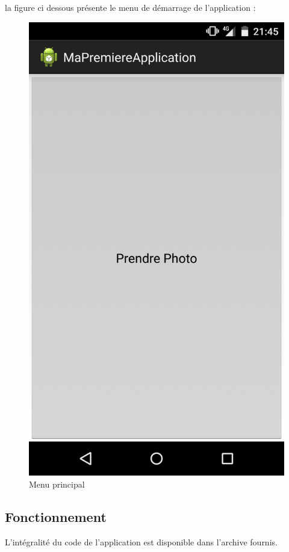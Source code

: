 la figure ci dessous présente le menu de démarrage de l'application : 
	\begin{figure}[H]
		\centering
		\includegraphics[scale=0.1]{images/appliMenu.png}
		\caption{Menu principal}
		\label{fig:image}
	\end{figure}

\subsection{Fonctionnement}
L'intégralité du code de l'application est disponible dans l'archive fournis.\\

